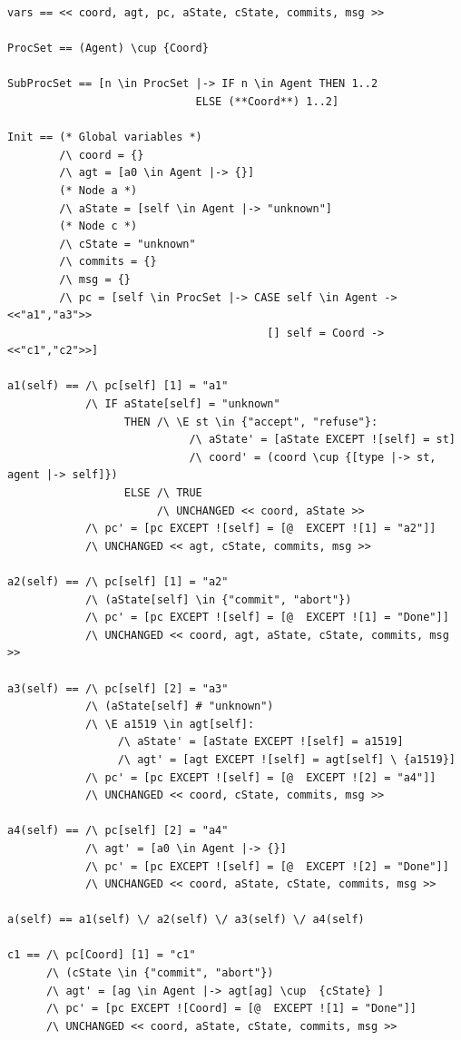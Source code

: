 \documentclass{thesul}
\newcommand{\tlaplus}{TLA\textsuperscript{+}\xspace}
\begin{document}
\begin{appendices}
\begin{lstlisting}[caption = \tlaplus translation for Sub-Processes, frame = tlrb, firstnumber = 1]
vars == << coord, agt, pc, aState, cState, commits, msg >>

ProcSet == (Agent) \cup {Coord}

SubProcSet == [n \in ProcSet |-> IF n \in Agent THEN 1..2
                             ELSE (**Coord**) 1..2]

Init == (* Global variables *)
        /\ coord = {}
        /\ agt = [a0 \in Agent |-> {}]
        (* Node a *)
        /\ aState = [self \in Agent |-> "unknown"]
        (* Node c *)
        /\ cState = "unknown"
        /\ commits = {}
        /\ msg = {}
        /\ pc = [self \in ProcSet |-> CASE self \in Agent -> <<"a1","a3">>
                                        [] self = Coord -> <<"c1","c2">>]

a1(self) == /\ pc[self] [1] = "a1"
            /\ IF aState[self] = "unknown"
                  THEN /\ \E st \in {"accept", "refuse"}:
                            /\ aState' = [aState EXCEPT ![self] = st]
                            /\ coord' = (coord \cup {[type |-> st, agent |-> self]})
                  ELSE /\ TRUE
                       /\ UNCHANGED << coord, aState >>
            /\ pc' = [pc EXCEPT ![self] = [@  EXCEPT ![1] = "a2"]]
            /\ UNCHANGED << agt, cState, commits, msg >>

a2(self) == /\ pc[self] [1] = "a2"
            /\ (aState[self] \in {"commit", "abort"})
            /\ pc' = [pc EXCEPT ![self] = [@  EXCEPT ![1] = "Done"]]
            /\ UNCHANGED << coord, agt, aState, cState, commits, msg >>

a3(self) == /\ pc[self] [2] = "a3"
            /\ (aState[self] # "unknown")
            /\ \E a1519 \in agt[self]:
                 /\ aState' = [aState EXCEPT ![self] = a1519]
                 /\ agt' = [agt EXCEPT ![self] = agt[self] \ {a1519}]
            /\ pc' = [pc EXCEPT ![self] = [@  EXCEPT ![2] = "a4"]]
            /\ UNCHANGED << coord, cState, commits, msg >>

a4(self) == /\ pc[self] [2] = "a4"
            /\ agt' = [a0 \in Agent |-> {}]
            /\ pc' = [pc EXCEPT ![self] = [@  EXCEPT ![2] = "Done"]]
            /\ UNCHANGED << coord, aState, cState, commits, msg >>

a(self) == a1(self) \/ a2(self) \/ a3(self) \/ a4(self)

c1 == /\ pc[Coord] [1] = "c1"
      /\ (cState \in {"commit", "abort"})
      /\ agt' = [ag \in Agent |-> agt[ag] \cup  {cState} ]
      /\ pc' = [pc EXCEPT ![Coord] = [@  EXCEPT ![1] = "Done"]]
      /\ UNCHANGED << coord, aState, cState, commits, msg >>


\end{lstlisting}
\end{appendices}
\end{document}
